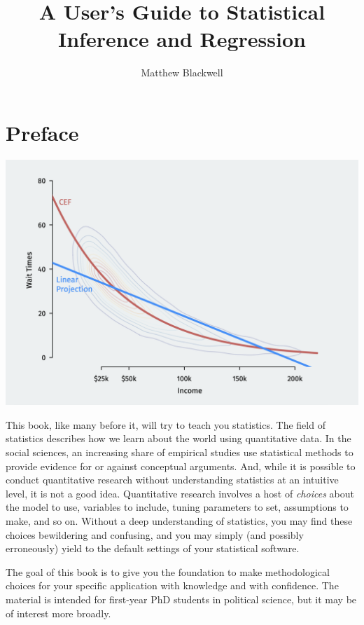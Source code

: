 \documentclass[
  13pt,
  letterpaper,
  DIV=11,
  numbers=noendperiod]{scrreprt}
\title{A User's Guide to Statistical Inference and Regression}
\author{Matthew Blackwell}
\date{}
\renewcommand*\contentsname{Table of contents}
\newcommand\contentsname{Table of contents}
\theoremstyle{definition}
\theoremstyle{definition}
\theoremstyle{plain}
\theoremstyle{remark}
\begin{document}
\maketitle

\renewcommand*\contentsname{Table of contents}
{
\hypersetup{linkcolor=}
\setcounter{tocdepth}{2}
\tableofcontents
}

\chapter*{Preface}\label{preface}


\includegraphics{assets/img/linear-approximation.png}

This book, like many before it, will try to teach you statistics. The
field of statistics describes how we learn about the world using
quantitative data. In the social sciences, an increasing share of
empirical studies use statistical methods to provide evidence for or
against conceptual arguments. And, while it is possible to conduct
quantitative research without understanding statistics at an intuitive
level, it is not a good idea. Quantitative research involves a host of
\emph{choices} about the model to use, variables to include, tuning
parameters to set, assumptions to make, and so on. Without a deep
understanding of statistics, you may find these choices bewildering and
confusing, and you may simply (and possibly erroneously) yield to the
default settings of your statistical software.

The goal of this book is to give you the foundation to make
methodological choices for your specific application with knowledge and
with confidence. The material is intended for first-year PhD students in
political science, but it may be of interest more broadly.
\end{document}
